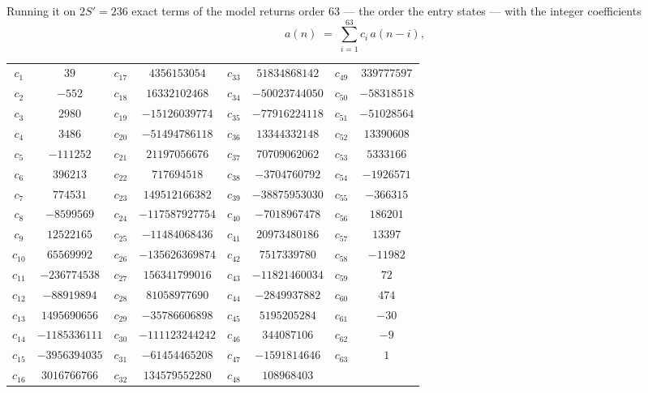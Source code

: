 \documentclass[11pt,a4paper]{article}
\theoremstyle{plain}
\theoremstyle{definition}
\begin{document}
Running it on $2S'=236$ exact terms of the model returns order $63$ --- the order the
entry states --- with the integer coefficients
\[
a(n)\;=\;\sum_{i=1}^{63}c_i\,a(n-i),
\]
\begin{center}\small
\begin{tabular}{cccccccc}
$c_{1}$ & $39$ & $c_{17}$ & $4356153054$ & $c_{33}$ & $51834868142$ & $c_{49}$ & $339777597$ \\
$c_{2}$ & $-552$ & $c_{18}$ & $16332102468$ & $c_{34}$ & $-50023744050$ & $c_{50}$ & $-58318518$ \\
$c_{3}$ & $2980$ & $c_{19}$ & $-15126039774$ & $c_{35}$ & $-77916224118$ & $c_{51}$ & $-51028564$ \\
$c_{4}$ & $3486$ & $c_{20}$ & $-51494786118$ & $c_{36}$ & $13344332148$ & $c_{52}$ & $13390608$ \\
$c_{5}$ & $-111252$ & $c_{21}$ & $21197056676$ & $c_{37}$ & $70709062062$ & $c_{53}$ & $5333166$ \\
$c_{6}$ & $396213$ & $c_{22}$ & $717694518$ & $c_{38}$ & $-3704760792$ & $c_{54}$ & $-1926571$ \\
$c_{7}$ & $774531$ & $c_{23}$ & $149512166382$ & $c_{39}$ & $-38875953030$ & $c_{55}$ & $-366315$ \\
$c_{8}$ & $-8599569$ & $c_{24}$ & $-117587927754$ & $c_{40}$ & $-7018967478$ & $c_{56}$ & $186201$ \\
$c_{9}$ & $12522165$ & $c_{25}$ & $-11484068436$ & $c_{41}$ & $20973480186$ & $c_{57}$ & $13397$ \\
$c_{10}$ & $65569992$ & $c_{26}$ & $-135626369874$ & $c_{42}$ & $7517339780$ & $c_{58}$ & $-11982$ \\
$c_{11}$ & $-236774538$ & $c_{27}$ & $156341799016$ & $c_{43}$ & $-11821460034$ & $c_{59}$ & $72$ \\
$c_{12}$ & $-88919894$ & $c_{28}$ & $81058977690$ & $c_{44}$ & $-2849937882$ & $c_{60}$ & $474$ \\
$c_{13}$ & $1495690656$ & $c_{29}$ & $-35786606898$ & $c_{45}$ & $5195205284$ & $c_{61}$ & $-30$ \\
$c_{14}$ & $-1185336111$ & $c_{30}$ & $-111123244242$ & $c_{46}$ & $344087106$ & $c_{62}$ & $-9$ \\
$c_{15}$ & $-3956394035$ & $c_{31}$ & $-61454465208$ & $c_{47}$ & $-1591814646$ & $c_{63}$ & $1$ \\
$c_{16}$ & $3016766766$ & $c_{32}$ & $134579552280$ & $c_{48}$ & $108968403$ &  &  \\
\end{tabular}
\end{center}
\end{document}
